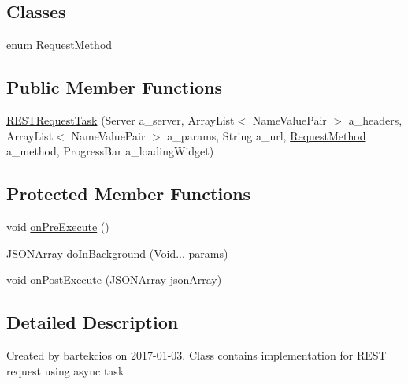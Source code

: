 \subsection*{Classes}
\begin{DoxyCompactItemize}
\item 
enum \hyperlink{enumcom_1_1bartekcios_1_1ticketsclient_1_1_r_e_s_t_request_task_1_1_request_method}{Request\+Method}
\end{DoxyCompactItemize}
\subsection*{Public Member Functions}
\begin{DoxyCompactItemize}
\item 
\hyperlink{classcom_1_1bartekcios_1_1ticketsclient_1_1_r_e_s_t_request_task_a97404410551d0051b08205d579993563}{R\+E\+S\+T\+Request\+Task} (Server a\+\_\+server, Array\+List$<$ Name\+Value\+Pair $>$ a\+\_\+headers, Array\+List$<$ Name\+Value\+Pair $>$ a\+\_\+params, String a\+\_\+url, \hyperlink{enumcom_1_1bartekcios_1_1ticketsclient_1_1_r_e_s_t_request_task_1_1_request_method}{Request\+Method} a\+\_\+method, Progress\+Bar a\+\_\+loading\+Widget)
\end{DoxyCompactItemize}
\subsection*{Protected Member Functions}
\begin{DoxyCompactItemize}
\item 
void \hyperlink{classcom_1_1bartekcios_1_1ticketsclient_1_1_r_e_s_t_request_task_a9d4c9ba2b41bb05f714f8444e8eacf29}{on\+Pre\+Execute} ()
\item 
J\+S\+O\+N\+Array \hyperlink{classcom_1_1bartekcios_1_1ticketsclient_1_1_r_e_s_t_request_task_a027bb4cefabb257a6a084a4b7fe38926}{do\+In\+Background} (Void... params)
\item 
void \hyperlink{classcom_1_1bartekcios_1_1ticketsclient_1_1_r_e_s_t_request_task_a485e13ae59c73938a4c9a5c4af3505e4}{on\+Post\+Execute} (J\+S\+O\+N\+Array json\+Array)
\end{DoxyCompactItemize}


\subsection{Detailed Description}
Created by bartekcios on 2017-\/01-\/03. Class contains implementation for R\+E\+ST request using async task 

